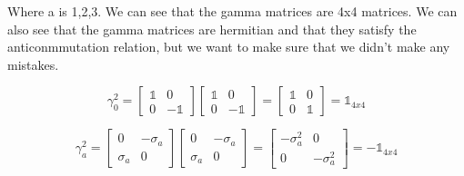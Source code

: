 Where a is 1,2,3. We can see that the gamma matrices are 4x4 matrices. We can also see that the gamma matrices are hermitian and that they satisfy the anticonmmutation relation, but we want to make sure that we didn't make any mistakes.

\begin{equation}
  \gamma_0^2 = \begin{bmatrix}
    \mathbb{1} & 0\\
    0 & -\mathbb{1}
  \end{bmatrix}\begin{bmatrix}
    \mathbb{1} & 0\\
    0 & -\mathbb{1}
  \end{bmatrix} = \begin{bmatrix}
    \mathbb{1} & 0\\
    0 & \mathbb{1}
  \end{bmatrix} = \mathbb{1}_{4x4}
\end{equation}


\begin{equation}
  \gamma_a^2 = \begin{bmatrix}
    0 & -\sigma_a\\
    \sigma_a & 0
  \end{bmatrix}\begin{bmatrix}
    0 & -\sigma_a\\
    \sigma_a & 0
  \end{bmatrix} = \begin{bmatrix}
    -\sigma_a^2 & 0\\
    0 & -\sigma_a^2\end{bmatrix} = - \mathbb{1}_{4x4}
\end{equation}

